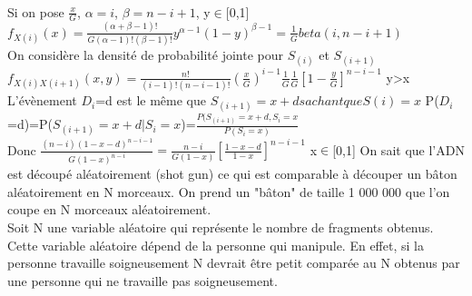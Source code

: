 \documentclass[12pt,a4paper]{article} %
\begin{document}
\\Si on pose $ \frac{x}{G}$, $\alpha=i$, $\beta=n-i+1$, y$\in$[0,1]                                                                                                                                                                                                                                                                                                                                                                                                                                                                                                                                                                                                                                                    \\ 
$f_{X(i)}(x)= \frac{(\alpha+\beta-1)!}{G(\alpha-1)!(\beta-1)!}y^{\alpha-1}(1-y)^{\beta-1}=\frac{1}{G}beta(i,n-i+1) $\\
On considère la densité de probabilité jointe pour $S_(i)$ et $S_{(i+1)}$\\
$f_{X(i)X(i+1)}(x,y) = \frac{n!}{(i-1)!(n-i-1)!} (\frac{x}{G})^{i-1} \frac{1}{G} \frac{1}{G}[1-\frac{y}{G}]^{n-i-1}$ y>x\\
L'évènement $D_i$=d est le même que $S_{(i+1)}=x+d sachant que S(i)=x$
P($D_i$=d)=P($S_{(i+1)}=x+d|S_i=x $)=$\frac{P(S_{(i+1)}=x+d,S_i=x}{P(S_i=x)} $\\
Donc $\frac{(n-i)(1-x-d)^{n-i-1}}{G(1-x)^{n-i}}=\frac{n-i}{G(1-x)}[\frac{1-x-d}{1-x}]^{n-i-1}$ x$\in$[0,1]                                                                                                                                                                                                                                                                                                                                                                                                                                                                                                                                                                                                                                                   
On sait que l'ADN est découpé aléatoirement (shot gun) ce qui est comparable à découper un bâton aléatoirement en N morceaux. 
On prend un "bâton" de taille 1 000 000 que l'on coupe en N morceaux aléatoirement. \\
Soit N une variable aléatoire qui représente le nombre de fragments obtenus.
Cette variable aléatoire dépend de la personne qui manipule. En effet, si la personne travaille soigneusement N devrait être petit comparée au N obtenus par une personne qui ne travaille pas soigneusement.\\
\end{document}
